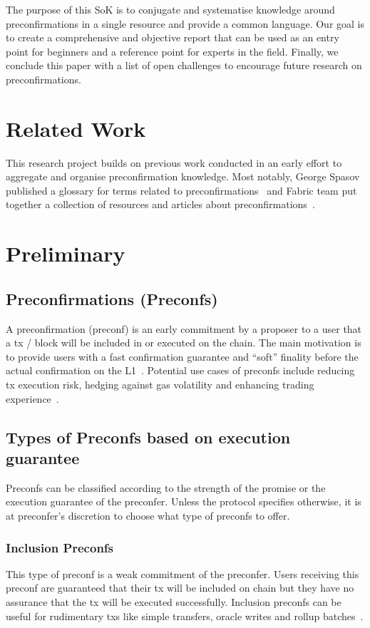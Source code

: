 \documentclass[conference]{IEEEtran}
\theoremstyle{boldstyle}
\begin{document}
The purpose of this SoK is to conjugate and systematise knowledge around preconfirmations in a single resource and provide a common language. Our goal is to create a comprehensive and objective report that can be used as an entry point for beginners and a reference point for experts in the field. Finally, we conclude this paper with a list of open challenges to encourage future research on preconfirmations.


\section{Related Work}
This research project builds on previous work conducted in an early effort to aggregate and organise preconfirmation knowledge. Most notably, George Spasov published a glossary for terms related to preconfirmations~\cite{W:PreconfirmationsGlossaryRequirements} and Fabric team put together a collection of resources and articles about preconfirmations~\cite{W:AwesomeBasedPreconfirmations}.


\section{Preliminary}
    \subsection{Preconfirmations (Preconfs)}
    A preconfirmation (preconf) is an early commitment by a proposer to a user that a tx / block will be included in or executed on the chain. The main motivation is to provide users with a fast confirmation guarantee and “soft” finality before the actual confirmation on the L1~\cite{W:Preconfirmations:Explained,W:PreconfirmationsGlossaryRequirements}. Potential use cases of preconfs include reducing tx execution risk, hedging against gas volatility and enhancing trading experience~\cite{W:Preconfirmations:TheFulfillment-DeliveryParadigm}.
    
    \subsection{Types of Preconfs based on execution guarantee} 
    Preconfs can be classified according to the strength of the promise or the execution guarantee of the preconfer. Unless the protocol specifies otherwise, it is at preconfer's discretion to choose what type of preconfs to offer.
        
        \subsubsection{Inclusion Preconfs}
        This type of preconf is a weak commitment of the preconfer. Users receiving this preconf are guaranteed that their tx will be included on chain but they have no assurance that the tx will be executed successfully. Inclusion preconfs can be useful for rudimentary txs like simple transfers, oracle writes and rollup batches~\cite{W:PreconfirmationsforVanillaBasedRollups,W:APricingModelforInclusionPreconfirmations}.
        
\end{document}
